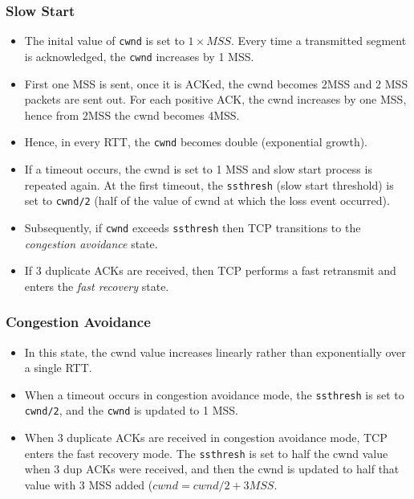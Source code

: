 \documentclass{article}
\theoremstyle{plain}
\theoremstyle{definition}
\begin{document}
\subsubsection{Slow Start}
\begin{itemize}
    \item The inital value of \texttt{cwnd} is set to $1\times MSS$. Every time a transmitted segment is acknowledged, the \texttt{cwnd} increases by 1 MSS. 
    
    \item First one MSS is sent, once it is ACKed, the cwnd becomes 2MSS and 2 MSS packets are sent out. For each positive ACK, the cwnd increases by one MSS, hence from 2MSS the cwnd becomes 4MSS. 
    
    \item Hence, in every RTT, the \texttt{cwnd} becomes double (exponential growth). 
    
    \item If a timeout occurs, the cwnd is set to 1 MSS and slow start process is repeated again. At the first timeout, the \texttt{ssthresh} (slow start threshold) is set to \texttt{cwnd/2} (half of the value of cwnd at which the loss event occurred). 
    
    \item Subsequently, if \texttt{cwnd} exceeds \texttt{ssthresh} then TCP transitions to the \textit{congestion avoidance} state.
    
    \item If 3 duplicate ACKs are received, then TCP performs a fast retransmit and enters the \textit{fast recovery} state.
\end{itemize}

\subsubsection{Congestion Avoidance}
\begin{itemize}
    \item  In this state, the cwnd value increases linearly rather than exponentially over a single RTT. 
    
    \item When a timeout occurs in congestion avoidance mode, the \texttt{ssthresh} is set to \texttt{cwnd/2}, and the \texttt{cwnd} is updated to 1 MSS. 
    
    \item When 3 duplicate ACKs are received in congestion avoidance mode, TCP enters the fast recovery mode. The \texttt{ssthresh} is set to half the cwnd value when 3 dup ACKs were received, and then the cwnd is updated to half that value with 3 MSS added ($cwnd = cwnd/2 + 3MSS$. 
\end{itemize}
\end{document}
